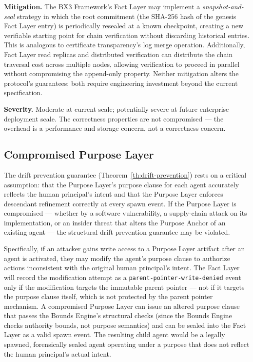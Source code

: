 \textbf{Mitigation.} The BX3 Framework's Fact Layer may implement a \textit{snapshot-and-seal} strategy in which the root commitment (the SHA-256 hash of the genesis Fact Layer entry) is periodically resealed at a known checkpoint, creating a new verifiable starting point for chain verification without discarding historical entries. This is analogous to certificate transparency's log merge operation. Additionally, Fact Layer read replicas and distributed verification can distribute the chain traversal cost across multiple nodes, allowing verification to proceed in parallel without compromising the append-only property. Neither mitigation alters the protocol's guarantees; both require engineering investment beyond the current specification.

\textbf{Severity.} Moderate at current scale; potentially severe at future enterprise deployment scale. The correctness properties are not compromised — the overhead is a performance and storage concern, not a correctness concern.

\subsection{Compromised Purpose Layer}

The drift prevention guarantee (Theorem~\ref{th:drift-prevention}) rests on a critical assumption: that the Purpose Layer's purpose clause for each agent accurately reflects the human principal's intent and that the Purpose Layer enforces descendant refinement correctly at every spawn event. If the Purpose Layer is compromised — whether by a software vulnerability, a supply-chain attack on its implementation, or an insider threat that alters the Purpose Anchor of an existing agent — the structural drift prevention guarantee may be violated.

Specifically, if an attacker gains write access to a Purpose Layer artifact after an agent is activated, they may modify the agent's purpose clause to authorize actions inconsistent with the original human principal's intent. The Fact Layer will record the modification attempt as a \texttt{parent-pointer-write-denied} event only if the modification targets the immutable parent pointer — not if it targets the purpose clause itself, which is not protected by the parent pointer mechanism. A compromised Purpose Layer can issue an altered purpose clause that passes the Bounds Engine's structural checks (since the Bounds Engine checks authority bounds, not purpose semantics) and can be sealed into the Fact Layer as a valid spawn event. The resulting child agent would be a legally spawned, forensically sealed agent operating under a purpose that does not reflect the human principal's actual intent.

